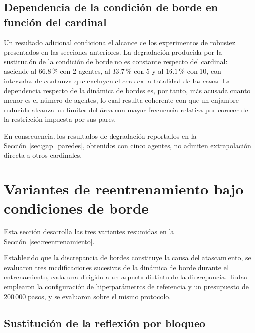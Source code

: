 \subsection*{Dependencia de la condición de borde en función del cardinal}

Un resultado adicional condiciona el alcance de los experimentos de robustez
presentados en las secciones anteriores. La degradación producida por la
sustitución de la condición de borde no es constante respecto del cardinal:
asciende al $66{.}8$\,\% con 2 agentes, al $33{.}7$\,\% con 5 y al $16{.}1$\,\% con 10, con intervalos de confianza que excluyen el cero en la
totalidad de los casos. La dependencia respecto de la dinámica de bordes es,
por tanto, más acusada cuanto menor es el número de agentes, lo cual resulta
coherente con que un enjambre reducido alcanza los límites del área con mayor
frecuencia relativa por carecer de la restricción impuesta por sus pares.

En consecuencia, los resultados de degradación reportados en la
Sección~\ref{sec:gap_paredes}, obtenidos con cinco agentes, no admiten
extrapolación directa a otros cardinales.


\section{Variantes de reentrenamiento bajo condiciones de borde}
\label{anx:reentrenamiento}

Esta sección desarrolla las tres variantes resumidas en la
Sección~\ref{sec:reentrenamiento}.


Establecido que la discrepancia de bordes constituye la causa del
atascamiento, se evaluaron tres modificaciones sucesivas de la dinámica de
borde durante el entrenamiento, cada una dirigida a un aspecto distinto de la
discrepancia. Todas emplearon la configuración de hiperparámetros de
referencia y un presupuesto de 200\,000 pasos, y se evaluaron sobre el mismo
protocolo.

\subsection*{Sustitución de la reflexión por bloqueo}

